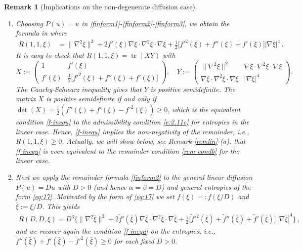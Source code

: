 \documentclass[reqno]{amsart}
\newtheorem{remark}[lemma]{Remark}
\newcommand{\tr}{\operatorname{tr}}
\begin{document}
\begin{remark}[Implications on the non-degenerate diffusion case]\label{linear}
\
\begin{enumerate}
\item[(a)]
Choosing $P(u)=u$ in \eqref{finform1}-\eqref{finform2}-\eqref{finform3}, we obtain the formula in \cite{AMTU} where
\begin{align*}%
R(1,1,\xi) 
&= \|\nabla^2\xi\|^2 
                        + 2 f'(\xi)\nabla\xi\cdot\nabla^2\xi\cdot\nabla\xi 
                        + \frac12 \big[ f'^2(\xi)+f''(\xi)+f'(\xi)\big]|\nabla\xi|^4 \,.
\end{align*}
It is easy to check that 
$R(1,1,\xi)= \tr(XY)$ with
$$
X:= \left(\begin{array}{cc} 1 & f'(\xi) \\ 
                        f'(\xi) & \frac12 \big[f'^2(\xi)+f''(\xi)+f'(\xi)\big]\end{array}\right),
                        \quad
Y:=\left(\begin{array}{cc} \|\nabla^2\xi\|^2 & \nabla\xi\cdot\nabla^2\xi\cdot\nabla\xi \\ \nabla\xi\cdot\nabla^2\xi\cdot\nabla\xi & |\nabla\xi|^4 \end{array}\right).
$$
The Cauchy-Schwarz inequality gives that $Y$ is positive semidefinite. The matrix $X$ is positive semidefinite if and only if $\det(X)=\tfrac12 (f''(\xi)+f'(\xi)-f'^2(\xi))\geq 0$, which is the equivalent condition \eqref{f-inequ} to the admissibility condition \eqref{e:2.11c} for entropies in the linear case. Hence, \eqref{f-inequ} implies the non-negativity of the remainder, i.e., $R(1,1,\xi)\ge0$.
Actually, we will show below, see Remark \ref{remlin}-(a), that \eqref{f-inequ} is even equivalent to the remainder condition \eqref{rem-condb} for the linear case.
\item[(b)] 
Next we apply the remainder formula \eqref{finform2} to the general linear diffusion $P(u)=Du$ with $D>0$ (and hence $\alpha=\beta=D$) and general entropies of the form \eqref{eq:17}. Motivated by the form of \eqref{eq:17} we set $f(\xi)=:\tilde f(\xi/D)$ and $\bar\xi:=\xi/D$. This yields
\begin{align*}
  R(D,D,\xi)
 =  D^3\Big\{ \|\nabla^2\bar\xi\|^2 
                        + 2 \tilde f'(\bar\xi)\nabla\bar\xi\cdot\nabla^2\bar\xi\cdot\nabla \bar\xi 
                        + \frac12 \big[\tilde f'^2(\bar\xi)+\tilde f''(\bar\xi)+\tilde f'(\bar\xi)\big]\,|\nabla\bar\xi|^4 \Big\}\,,
\end{align*}
and we recover again the condition \eqref{f-inequ} on the entropies, i.e., $\tilde f''(\bar \xi)+\tilde f'(\bar \xi)-\tilde f'^2(\bar \xi)\geq 0$ for each fixed $D>0$.
\end{enumerate}
\end{remark}
\end{document}
